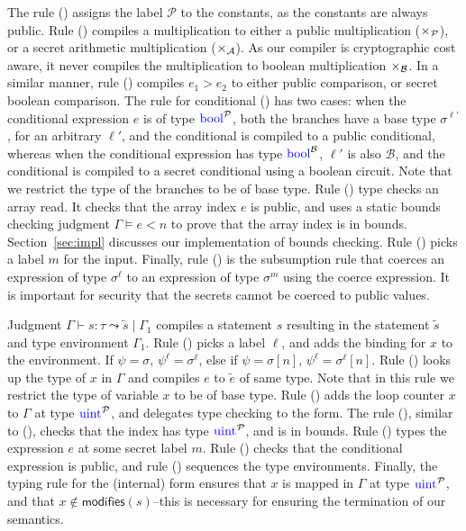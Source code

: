 The rule ({}) assigns the label $\mathcal{P}$ to the
constants, as the constants are always public. Rule ({})
compiles a multiplication to either a public multiplication  ($\times_{\mathcal{P}}$), or a
secret arithmetic multiplication ($\times_{\mathcal{A}}$). As
our compiler is cryptographic cost aware, it never compiles the
multiplication to boolean multiplication $\times_{\mathcal{B}}$. In a similar manner,
rule ({}) compiles $e_{1} > e_{2}$ to either public comparison,
or secret boolean comparison. The rule for conditional
({}) has two cases: when the conditional expression $e$ is of
type $\kw{bool}^{\mathcal{P}}$, both the branches have a base type
$\sigma^{\ell'}$, for an arbitrary $\ell'$, and the conditional is
compiled to a public conditional, whereas when the conditional
expression has type $\kw{bool}^{\mathcal{B}}$, $\ell'$ is also
$\mathcal{B}$, and the conditional is compiled to a secret conditional
using a boolean circuit. Note that we restrict the type of the branches
to be of base type. 
Rule ({}) type checks an array read. It checks
that the array index $e$ is public, and uses a static bounds checking
judgment $\Gamma \models e < n$ to prove that the array index is in
bounds. Section~\ref{sec:impl} discusses our implementation of bounds
checking. Rule ({}) picks a label $m$ for the input. Finally,
rule ({}) is the subsumption rule that coerces an expression of
type $\sigma^{\ell}$ to an expression of type $\sigma^{m}$ using the
coerce expression. It is important for security that the secrets cannot be coerced to public
values.

Judgment $\Gamma \vdash s : \tau \leadsto \widetilde{s} \mid \Gamma_{1}$
compiles a statement $s$ resulting in the statement $\widetilde{s}$
and type environment $\Gamma_{1}$. Rule ({}) picks a label
$\ell$, and adds the binding for $x$ to the environment. If $\psi = \sigma$, $\psi^\ell = \sigma^\ell$, else if $\psi = \sigma[n]$, $\psi^\ell = \sigma^\ell[n]$. 
Rule ({}) looks up the type of $x$ in $\Gamma$ and compiles $e$ to $\tilde{e}$ of same type.
Note that in this rule we restrict the type of variable $x$ to be of base type.
Rule ({}) adds the loop counter $x$ to $\Gamma$ at type
$\kw{uint}^{\mathcal{P}}$, and delegates type checking to the
 form. The rule ({}), similar to ({}),
checks that the index has type $\kw{uint}^{\mathcal{P}}$, and is in
bounds. Rule ({})
types the expression $e$ at some secret label $m$. Rule ({})
checks that the conditional expression is public, and rule
({}) sequences the type environments. Finally, the typing
rule for the (internal)  form ensures that $x$ is mapped in
$\Gamma$ at type $\kw{uint}^{\mathcal{P}}$, and that $x \notin
\mathsf{modifies}(s)$--this is necessary for ensuring the termination
of our semantics.



